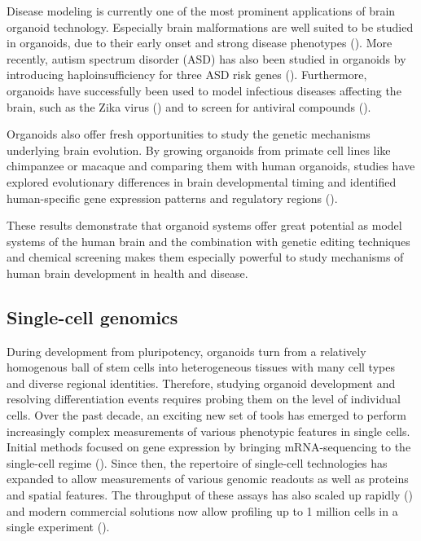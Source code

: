 Disease modeling is currently one of the most prominent applications of brain organoid technology. Especially brain malformations are well suited to be studied in organoids, due to their early onset and strong disease phenotypes (\cite{klaus_altered_2019,lancaster_cerebral_2013}). More recently, autism spectrum disorder (ASD) has also been studied in organoids by introducing haploinsufficiency for three ASD risk genes (\cite{paulsen_autism_2022}). Furthermore, organoids have successfully been used to model infectious diseases affecting the brain, such as the Zika virus (\cite{qian_brain-region-specific_2016,dang_zika_2016}) and to screen for antiviral compounds (\cite{zhou_high-content_2017}). 

Organoids also offer fresh opportunities to study the genetic mechanisms underlying brain evolution. By growing organoids from primate cell lines like chimpanzee or macaque and comparing them with human organoids, studies have explored evolutionary differences in brain developmental timing and identified human-specific gene expression patterns and regulatory regions (\cite{kanton_organoid_2019,mora-bermudez_differences_2016,pollen_establishing_2019}).

These results demonstrate that organoid systems offer great potential as model systems of the human brain and the combination with genetic editing techniques and chemical screening makes them especially powerful to study mechanisms of human brain development in health and disease.

\clearpage


\subsection{Single-cell genomics}


During development from pluripotency, organoids turn from a relatively homogenous ball of stem cells into heterogeneous tissues with many cell types and diverse regional identities. Therefore, studying organoid development and resolving differentiation events requires probing them on the level of individual cells. Over the past decade, an exciting new set of tools has emerged to perform increasingly complex measurements of various phenotypic features in single cells. Initial methods focused on gene expression by bringing mRNA-sequencing to the single-cell regime (\cite{tang_mrna-seq_2009,islam_characterization_2011}). Since then, the repertoire of single-cell technologies has expanded to allow measurements of various genomic readouts as well as proteins and spatial features. The throughput of these assays has also scaled up rapidly (\cite{svensson_exponential_2018}) and modern commercial solutions now allow profiling up to 1 million cells in a single experiment (\cite{srivatsan_massively_2020,mulqueen_high-content_2021}). 

